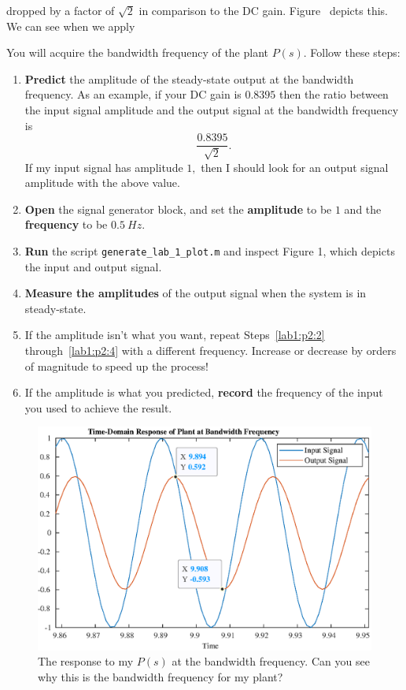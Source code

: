 dropped by a factor of \(\sqrt{2}\) in comparison to the DC gain.
Figure~ depicts this. We can see when we apply
%
\begin{procedure}
  You will acquire the bandwidth frequency of the plant \(P(s)\).
  Follow these steps:
  \begin{enumerate}[label=(\arabic*)]
    \item{
      \textbf{Predict} the amplitude of the steady-state output at the
      bandwidth frequency. As an example, if your DC gain is \(0.8395\) then
      the ratio between the input signal amplitude and the output signal
      at the bandwidth frequency is
      \[
        \frac{0.8395}{\sqrt{2}}.
      \]
      If my input signal has amplitude \(1,\) then I should look for
      an output signal amplitude with the above value.
    }
    \item{
      \textbf{Open} the signal generator block, and set the
      \textbf{amplitude} to be \(1\) and
      the \textbf{frequency} to be \(\SI{0.5}{Hz}.\)
      \label{lab1:p2:2}
    }
    \item{
      \textbf{Run} the script \texttt{generate\_lab\_1\_plot.m} and inspect
      Figure 1, which depicts the input and output signal.
    }
    \item{
      \textbf{Measure the amplitudes} of the output signal
      when the system is in steady-state.
      \label{lab1:p2:4}
    }
    \item{
      If the amplitude isn't what you want, repeat Steps~\ref{lab1:p2:2} through~\ref{lab1:p2:4} with a different frequency. Increase or decrease
      by orders of magnitude to speed up the process!
    }
    \item{
      If the amplitude is what you predicted, \textbf{record} the frequency
      of the input you used to achieve the result.
    }
  \end{enumerate}
  \label{lab1:p2}
\end{procedure}
%
\begin{figure}
  \includegraphics{images/Lab_1_Bandwidth.eps}
  \caption{The response to my \(P(s)\) at the bandwidth frequency.
  Can you see why this is the bandwidth frequency for my plant?}
  \label{fig:lab1:bandwidth}
\end{figure}
